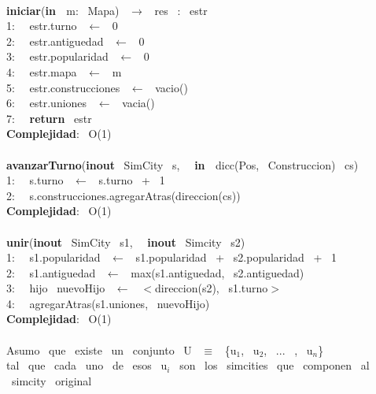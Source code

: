 \begin{Algoritmos} \\
    \noindent \makebox[\linewidth]{\rule{\textwidth}{0.4pt}}
\textbf{iniciar}(\textbf{in \ }m: \ Mapa) \ $\longrightarrow$ \ res \ : \ estr\\
1: \  \ estr.turno \ $\leftarrow$ \ 0\\
2: \  \ estr.antiguedad \ $\leftarrow$ \ 0\\
3: \  \ estr.popularidad \ $\leftarrow$ \ 0\\
4: \  \ estr.mapa \ $\leftarrow$ \ m\\
5: \  \ estr.construcciones \ $\leftarrow$ \ vacio()\\
6: \  \ estr.uniones \ $\leftarrow$ \ vacia()\\
7: \  \ \textbf{return} \ estr\\
\textbf{Complejidad}: \ O(1)\\
\makebox[\linewidth]{\rule{\textwidth}{0.4pt}}
\\
\makebox[\linewidth]{\rule{\textwidth}{0.4pt}}
\textbf{avanzarTurno}(\textbf{inout} \ SimCity \ s, \  \ \textbf{in \ }dicc(Pos, \ Construccion) \ cs)\\
1: \  \ s.turno \ $\leftarrow$ \ s.turno \ + \ 1 \ \\
2: \  \ s.construcciones.agregarAtras(direccion(cs))\\
\textbf{Complejidad}: \ O(1)\\
\makebox[\linewidth]{\rule{\textwidth}{0.4pt}}
\\
\makebox[\linewidth]{\rule{\textwidth}{0.4pt}}
\textbf{unir}(\textbf{inout} \ SimCity \ s1, \  \ \textbf{inout} \ Simcity \ s2)\\
1: \  \ s1.popularidad \ $\leftarrow$ \ s1.popularidad \ + \ s2.popularidad \ + \ 1\\
2: \  \ s1.antiguedad \ $\leftarrow$ \ max(s1.antiguedad, \ s2.antiguedad)\\
3: \  \ hijo \ nuevoHijo \ $\leftarrow$ \ $<$direccion(s2), \ s1.turno$>$\\
4: \  \ agregarAtras(s1.uniones, \ nuevoHijo)\\
\textbf{Complejidad}: \ O(1)\\
\makebox[\linewidth]{\rule{\textwidth}{0.4pt}}
\\
Asumo \ que \ existe \ un \ conjunto \ U \ $\equiv$ \ \{u$_1$, \ u$_2$, \ ... \ , \ u$_n$\}\\
tal \ que \ cada \ uno \ de \ esos \ u$_i$ \ son \ los \ simcities \ que \ componen \ al \ simcity \ original\\

\end{Algoritmos}
